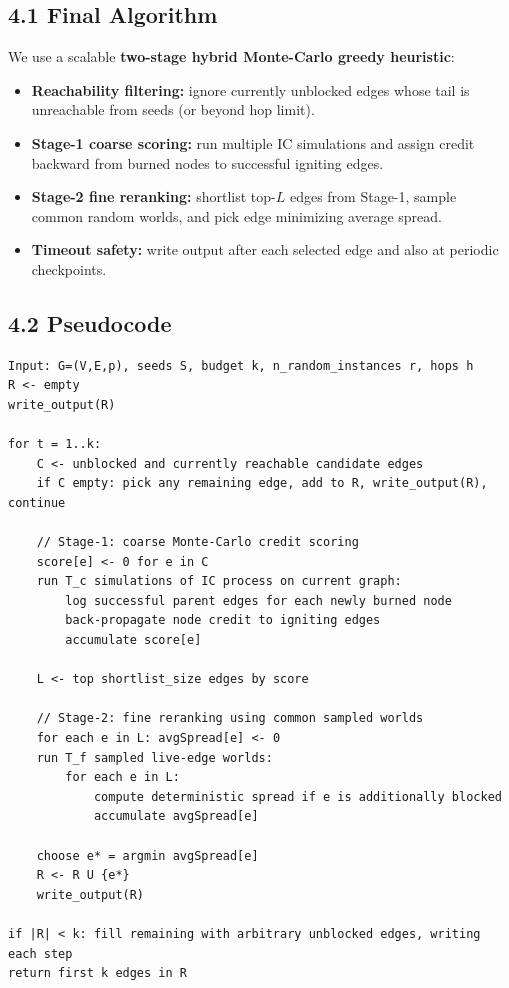 \documentclass[9pt,a4paper]{article}
\begin{document}
\subsection*{4.1 Final Algorithm}
We use a scalable \textbf{two-stage hybrid Monte-Carlo greedy heuristic}:
\begin{itemize}
\item \textbf{Reachability filtering:} ignore currently unblocked edges whose
tail is unreachable from seeds (or beyond hop limit).
\item \textbf{Stage-1 coarse scoring:} run multiple IC simulations and assign
credit backward from burned nodes to successful igniting edges.
\item \textbf{Stage-2 fine reranking:} shortlist top-$L$ edges from Stage-1,
sample common random worlds, and pick edge minimizing average spread.
\item \textbf{Timeout safety:} write output after each selected edge and also
at periodic checkpoints.
\end{itemize}

\subsection*{4.2 Pseudocode}
\begin{verbatim}
Input: G=(V,E,p), seeds S, budget k, n_random_instances r, hops h
R <- empty
write_output(R)

for t = 1..k:
    C <- unblocked and currently reachable candidate edges
    if C empty: pick any remaining edge, add to R, write_output(R), continue

    // Stage-1: coarse Monte-Carlo credit scoring
    score[e] <- 0 for e in C
    run T_c simulations of IC process on current graph:
        log successful parent edges for each newly burned node
        back-propagate node credit to igniting edges
        accumulate score[e]

    L <- top shortlist_size edges by score

    // Stage-2: fine reranking using common sampled worlds
    for each e in L: avgSpread[e] <- 0
    run T_f sampled live-edge worlds:
        for each e in L:
            compute deterministic spread if e is additionally blocked
            accumulate avgSpread[e]

    choose e* = argmin avgSpread[e]
    R <- R U {e*}
    write_output(R)

if |R| < k: fill remaining with arbitrary unblocked edges, writing each step
return first k edges in R
\end{verbatim}
\end{document}
